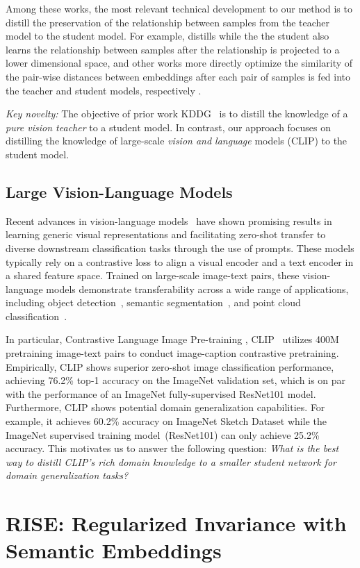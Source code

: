 \documentclass[10pt,twocolumn,letterpaper]{article}
\begin{document}
Among these works, the most relevant technical development to our method 
is to distill the preservation of the relationship between samples
from the teacher model to the student model. 
For example, 
\cite{DBLP:journals/tnn/ChenWXXT21} distills while the 
the student also learns the relationship between samples 
after the relationship is projected to a lower dimensional space, 
and other works more directly optimize
the similarity of 
the pair-wise distances between 
embeddings after each pair of samples 
is fed into the teacher and student models, respectively
\cite{DBLP:conf/cvpr/0004YLWCR19,DBLP:conf/iccv/PengJLZWLZ019,DBLP:conf/cvpr/LiuCLYHLD19,DBLP:conf/cvpr/ParkKLC19}. 

\emph{Key novelty:} 
The objective of prior work KDDG~\cite{wang2021embracing} is to distill the knowledge of a \emph{pure vision teacher} to a student model. In contrast, our approach focuses on distilling the knowledge of large-scale \emph{vision and language} models (CLIP) to the student model.





\subsection{Large Vision-Language Models}
Recent advances in vision-language models~\cite{radford2021learning,jia2021scaling,yang2022unicl,yao2021filip,yang2022vision,you2022learning} have shown promising results in learning generic visual representations and facilitating zero-shot transfer to diverse downstream classification tasks through the use of prompts. These models typically rely on a contrastive loss to align a visual encoder and a text encoder in a shared feature space. Trained on large-scale image-text pairs, these vision-language models demonstrate transferability across a wide range of applications, including object detection~\cite{gu2021open}, semantic segmentation~\cite{zhou2022extract}, and point cloud classification~\cite{zhang2022pointclip}. 

In particular, Contrastive Language Image Pre-training \ie, CLIP~\cite{radford2021learning} utilizes 400M pretraining image-text pairs to conduct image-caption contrastive pretraining.
Empirically, CLIP shows superior zero-shot image classification performance, achieving 76.2\% top-1  accuracy on the ImageNet validation set, which is on par with the performance of an ImageNet fully-supervised ResNet101 model. Furthermore, CLIP shows potential domain generalization capabilities. For example, it achieves 60.2\% accuracy on ImageNet Sketch Dataset while the ImageNet supervised training model~(ResNet101) can only achieve 25.2\% accuracy. This motivates us to answer the following question: \emph{What is the best way to distill CLIP's rich domain knowledge to a smaller student network for domain generalization tasks?} \section{RISE: Regularized Invariance with Semantic Embeddings}
\label{sec:method}
\end{document}
